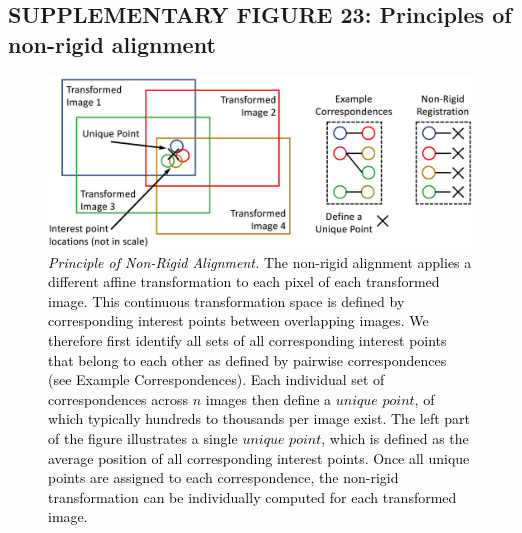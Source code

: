 \documentclass[]{spie}  %
\def\red{\textcolor{black}}
\begin{document}
\pagebreak

\subsection*{SUPPLEMENTARY FIGURE 23: Principles of non-rigid alignment}
\vspace{1mm}
\begin{figure}[h!]
\includegraphics[width=\textwidth]{non-rigid.png}
\vspace{-2.0mm}
\caption{\hspace{-0.5mm} \red{\emph{Principle of Non-Rigid Alignment.} The non-rigid alignment applies a different affine transformation to each pixel of each transformed image. This continuous transformation space is defined by corresponding interest points between overlapping images. We therefore first identify all sets of all corresponding interest points that belong to each other as defined by pairwise correspondences (see Example Correspondences). Each individual set of correspondences across $n$ images then define a $unique$ $point$, of which typically hundreds to thousands per image exist. The left part of the figure illustrates a single $unique$ $point$, which is defined as the average position of all corresponding interest points. Once all unique points are assigned to each correspondence, the non-rigid transformation can be individually computed for each transformed image.
}}
\label{fig:non-rigid}
\end{figure}
\end{document}
